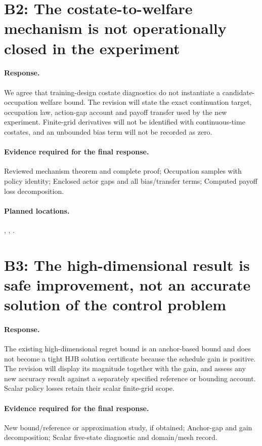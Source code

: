 \section*{B2: The costate-to-welfare mechanism is not operationally closed in the experiment}
\paragraph*{Response.} We agree that training-design costate diagnostics do not instantiate a candidate-occupation welfare bound. The revision will state the exact continuation target, occupation law, action-gap account and payoff transfer used by the new experiment. Finite-grid derivatives will not be identified with continuous-time costates, and an unbounded bias term will not be recorded as zero.
\paragraph*{Evidence required for the final response.} Reviewed mechanism theorem and complete proof; Occupation samples with policy identity; Enclosed actor gaps and all bias/transfer terms; Computed payoff loss decomposition.
\paragraph*{Planned locations.} , , .

\section*{B3: The high-dimensional result is safe improvement, not an accurate solution of the control problem}
\paragraph*{Response.} The existing high-dimensional regret bound is an anchor-based bound and does not become a tight HJB solution certificate because the schedule gain is positive. The revision will display its magnitude together with the gain, and assess any new accuracy result against a separately specified reference or bounding account. Scalar policy losses retain their scalar finite-grid scope.
\paragraph*{Evidence required for the final response.} New bound/reference or approximation study, if obtained; Anchor-gap and gain decomposition; Scalar five-state diagnostic and domain/mesh record.

